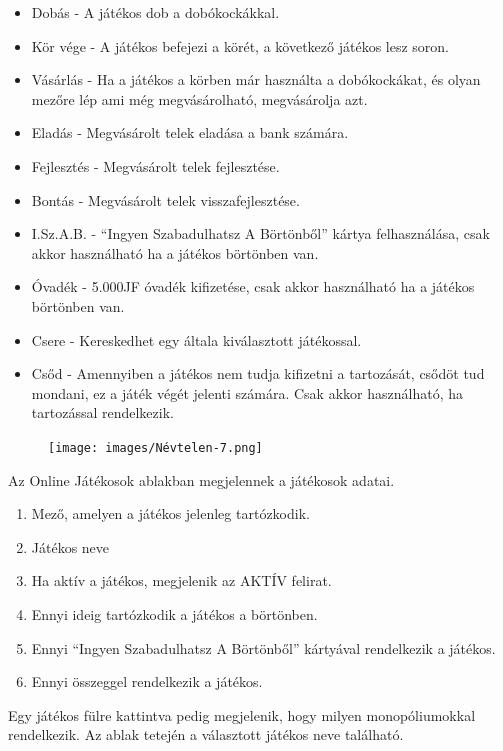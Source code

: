 
\begin{itemize}
	\item Dobás - A játékos dob a dobókockákkal.
	\item Kör vége - A játékos befejezi a körét, a következő játékos lesz soron.
	\item Vásárlás - Ha a játékos a körben már használta a dobókockákat, és olyan mezőre lép ami még megvásárolható, megvásárolja azt.
	\item Eladás - Megvásárolt telek eladása a bank számára.
	\item Fejlesztés - Megvásárolt telek fejlesztése.
	\item Bontás - Megvásárolt telek visszafejlesztése.
	\item I.Sz.A.B. - “Ingyen Szabadulhatsz A Börtönből” kártya felhasználása, csak akkor használható ha a játékos börtönben van.
	\item Óvadék - 5.000JF óvadék kifizetése, csak akkor használható ha a játékos börtönben van.
	\item Csere - Kereskedhet egy általa kiválasztott játékossal.
	\item Csőd - Amennyiben a játékos nem tudja kifizetni a tartozását, csődöt tud mondani, ez a játék végét jelenti számára. Csak akkor használható, ha tartozással rendelkezik.
\end{itemize}


\begin{figure}[h!]
\centering
\texttt{[image: images/Névtelen-7.png]}
\label{fig:ff}
\end{figure}

Az Online Játékosok ablakban megjelennek a játékosok adatai.
\begin{enumerate}
	\item Mező, amelyen a játékos jelenleg tartózkodik.
	\item Játékos neve
	\item Ha aktív a játékos, megjelenik az AKTÍV felirat.
	\item Ennyi ideig tartózkodik a játékos a börtönben.
	\item Ennyi “Ingyen Szabadulhatsz A Börtönből” kártyával rendelkezik a játékos.
	\item Ennyi összeggel rendelkezik a játékos.
\end{enumerate}
\newpage
Egy játékos fülre kattintva pedig megjelenik, hogy milyen monopóliumokkal rendelkezik. Az ablak tetején a választott játékos neve található.

